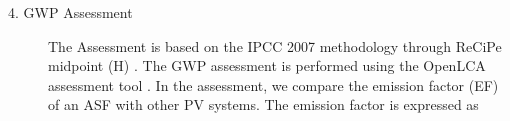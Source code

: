 \begin{description}




\item[4. GWP Assessment] The Assessment is based on the IPCC 2007 methodology through ReCiPe midpoint (H) \cite{zelm2009recipe}. The GWP assessment is performed using the OpenLCA assessment tool \cite{ciroth2007ict}. In the assessment, we compare the emission factor (EF) of an ASF with other PV systems. The emission factor is expressed as 


\end{description}
